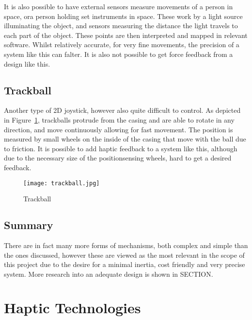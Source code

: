 It is also possible to have external sensors measure movements of a person in space, ora person holding set instruments in space. These work by a light source illuminating the object, and sensors measuring the distance the light travels to each part of the object. These points are then interpreted and mapped in relevant software. Whilst relatively accurate, for very fine movements, the precision of a system like this can falter. It is also not possible to get force feedback from a design like this.



\subsection{Trackball} %
\label{sub:trackball}

Another type of 2D joystick, however also quite difficult to control.
As depicted in Figure~\ref{fig:trackball}, trackballs protrude from the casing and are able to rotate in any direction, and move continuously allowing for fast movement.
The position is measured by small wheels on the inside of the casing that move with the ball due to friction.
It is possible to add haptic feedback to a system like this, although due to the necessary size of the positionsensing wheels, hard to get a desired feedback.

\begin{figure}
  \centering
  \texttt{[image: trackball.jpg]}
  \caption{Trackball}
  \label{fig:trackball}
\end{figure}


\subsection{Summary} %
\label{sub:summary}

There are in fact many more forms of mechanisms, both complex and simple than the ones discussed, however these are viewed as the most relevant in the scope of this project due to the desire for a minimal inertia, cost friendly and very precise system. More research into an adequate design is shown in SECTION.



\section{Haptic Technologies} %
\label{sec:haptic_technologies}

